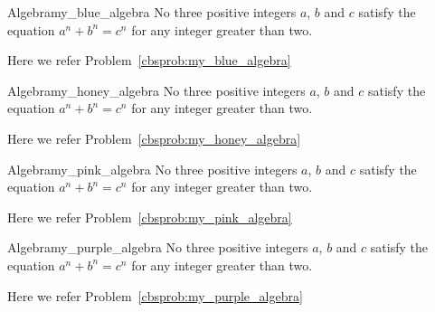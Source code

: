 \documentclass[11pt, letterpaper]{../exercise}
\begin{document}
    \begin{cbblueproblem}{Algebra}{my_blue_algebra}
    No three positive integers \(a\), \(b\) and \(c\) satisfy the equation
    \(a^{n} + b^{n} = c^{n}\) for any integer greater than two.
    \end{cbblueproblem}
    Here we refer Problem~\ref{cbsprob:my_blue_algebra}%

    \begin{cbhoneyproblem}{Algebra}{my_honey_algebra}
    No three positive integers \(a\), \(b\) and \(c\) satisfy the equation
    \(a^{n} + b^{n} = c^{n}\) for any integer greater than two.
    \end{cbhoneyproblem}
    Here we refer Problem~\ref{cbsprob:my_honey_algebra}%

    \begin{cbpinkproblem}{Algebra}{my_pink_algebra}
    No three positive integers \(a\), \(b\) and \(c\) satisfy the equation
    \(a^{n} + b^{n} = c^{n}\) for any integer greater than two.
    \end{cbpinkproblem}
    Here we refer Problem~\ref{cbsprob:my_pink_algebra}%

    \begin{cbpurpleproblem}{Algebra}{my_purple_algebra}
    No three positive integers \(a\), \(b\) and \(c\) satisfy the equation
    \(a^{n} + b^{n} = c^{n}\) for any integer greater than two.
    \end{cbpurpleproblem}
    Here we refer Problem~\ref{cbsprob:my_purple_algebra}%

\end{document}

